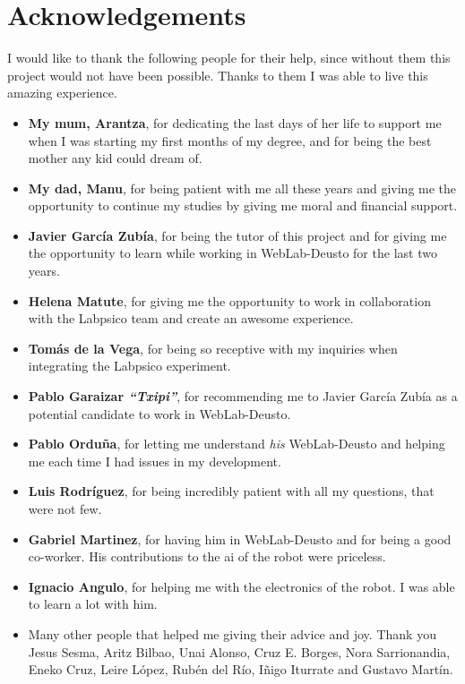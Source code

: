 \chapter*{Acknowledgements}

I would like to thank the following people for their help, since without them this project would not
have been possible. Thanks to them I was able to live this amazing experience.

\begin{itemize}
	\item \textbf{My mum, Arantza}, for dedicating the last days of her life to support me when I
	was starting my first months of my degree, and for being the best mother any kid could dream of.

	\item \textbf{My dad, Manu}, for being patient with me all these years and giving me the
	opportunity to continue my studies by giving me moral and financial support.

	\item \textbf{Javier García Zubía}, for being the tutor of this project and for giving me the
	opportunity to learn while working in WebLab-Deusto for the last two years.

	\item \textbf{Helena Matute}, for giving me the opportunity to work in collaboration with the
	Labpsico team and create an awesome experience.

	\item \textbf{Tomás de la Vega}, for being so receptive with my inquiries when integrating the
	Labpsico experiment.

	\item \textbf{Pablo Garaizar \emph{``Txipi''}}, for recommending me to Javier García Zubía as a
	potential candidate to work in WebLab-Deusto.

	\item \textbf{Pablo Orduña}, for letting me understand \emph{his} WebLab-Deusto and helping me
	each time I had issues in my development.

	\item \textbf{Luis Rodríguez}, for being incredibly patient with all my questions, that were not
	few.

	\item \textbf{Gabriel Martinez}, for having him in WebLab-Deusto and for being a good co-worker.
	His contributions to the \acrshort{ai} of the robot were priceless.

	\item \textbf{Ignacio Angulo}, for helping me with the electronics of the robot. I was able to
	learn a lot with him.

	\item Many other people that helped me giving their advice and joy. Thank you Jesus Sesma, Aritz
	Bilbao, Unai Alonso, Cruz E. Borges, Nora Sarrionandia, Eneko Cruz, Leire López, Rubén del Río,
	Iñigo Iturrate and Gustavo Martín.
\end{itemize}

